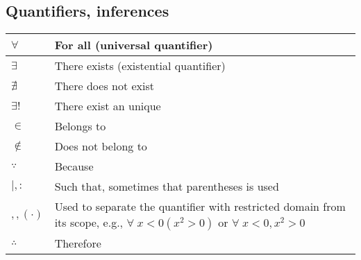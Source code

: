 \documentclass{article}
\begin{document}
\subsection{Quantifiers, inferences}
\begin{xltabular}{\textwidth}{XX}
	\(\forall\)                  & For all (universal quantifier) \cite{grahamConcreteMathematicsFoundation1989}                                                                                                                                \\ \hline
	\(\exists\)                  & There exists (existential quantifier) \cite{grahamConcreteMathematicsFoundation1989}                                                                                                                         \\ \hline
	\(\nexists\)                 & There does not exist \cite{grahamConcreteMathematicsFoundation1989}                                                                                                                                          \\ \hline
	\(\exists!\)                 & There exist an unique \cite{grahamConcreteMathematicsFoundation1989}                                                                                                                                         \\ \hline
	\(\in\)                      & Belongs to \cite{grahamConcreteMathematicsFoundation1989}                                                                                                                                                    \\ \hline
	\(\not\in\)                  & Does not belong to \cite{grahamConcreteMathematicsFoundation1989}                                                                                                                                            \\ \hline
	\(\because\)                 & Because \cite{grahamConcreteMathematicsFoundation1989}                                                                                                                                                       \\ \hline
	\(\mid, :\)                  & Such that, sometimes that parentheses is used \cite{grahamConcreteMathematicsFoundation1989}                                                                                                                 \\ \hline
	\(, , \left( \cdot \right)\) & Used to separate the quantifier with restricted domain from its scope, e.g., \(\forall \; x < 0 \left( x^{2} > 0 \right)\) or \(\forall \; x < 0, x^{2} > 0\) \cite{grahamConcreteMathematicsFoundation1989} \\ \hline
	\(\therefore\)               & Therefore \cite{grahamConcreteMathematicsFoundation1989}                                                                                                                                                     \\
\end{xltabular}
\end{document}
